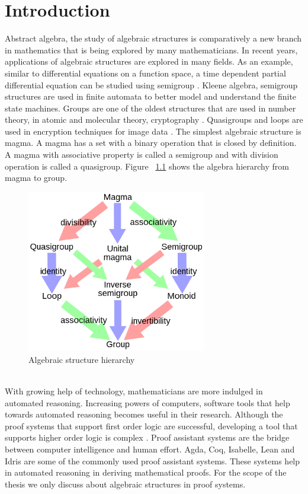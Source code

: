 \chapter{Introduction}
Abstract algebra, the study of algebraic structures is comparatively a new branch in mathematics that is being explored by many mathematicians. In recent years, applications of algebraic structures are explored in many fields. As an example, similar to differential equations on a function space, a time dependent partial differential equation can be studied using semigroup \cite{liaqat2021some}. Kleene algebra, semigroup structures are used in finite automata to better model and understand the finite state machines. Groups are one of the oldest structures that are used in number theory, in atomic and molecular theory, cryptography \cite{enwiki:1133598242}. Quasigroups and loops are used in encryption techniques for image data \cite{didurik2018some}. The simplest algebraic structure is magma. A magma has a set with a binary operation that is closed by definition. A magma with associative property is called a semigroup and with division operation is called a quasigroup. Figure ~\ref{fig_magma} shows the algebra hierarchy from magma to group. 
 \begin{figure}[ht]
	\centering
	\includegraphics[width=0.7\textwidth]{figures/Sample/Magma_to_group.jpg}
	\caption{Algebraic structure hierarchy \cite{enwiki:1107380309}}
	\label{fig_magma}
\end{figure}
\\

With growing help of technology, mathematicians are more indulged in automated reasoning. Increasing powers of computers, software tools that help towards automated reasoning becomes useful in their research. Although the proof systems that support first order logic are successful, developing a tool that supports higher order logic is complex \cite{phillips2010automated}. Proof assistant systems are the bridge between computer intelligence and human effort. Agda, Coq, Isabelle, Lean and Idris are some of the commonly used proof assistant systems. These systems help in automated reasoning in deriving mathematical proofs. For the scope of the thesis we only discuss about algebraic structures in proof systems.\\


